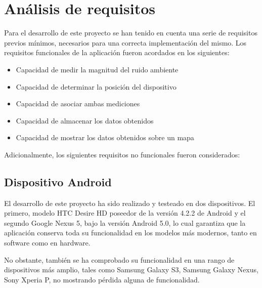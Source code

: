 \label{chp:Impl}

\section{Análisis de requisitos}
\label{sec:Requirements}

Para el desarrollo de este proyecto se han tenido en cuenta una serie de requisitos previos mínimos, necesarios para una correcta implementación del mismo. Los requisitos funcionales de la aplicación fueron acordados en los siguientes:

\begin{itemize}

\item Capacidad de medir la magnitud del ruido ambiente
\item Capacidad de determinar la posición del dispositivo
\item Capacidad de asociar ambas mediciones
\item Capacidad de almacenar los datos obtenidos
\item Capacidad de mostrar los datos obtenidos sobre un mapa

\end{itemize}


Adicionalmente, los siguientes requisitos no funcionales fueron considerados:

\subsection{Dispositivo Android}

El desarrollo de este proyecto ha sido realizado y testeado en dos dispositivos. El primero, modelo HTC Desire HD poseedor de la versión 4.2.2 de Android y el segundo Google Nexus 5, bajo la versión Android 5.0, lo cual garantiza que la aplicación conserva toda su funcionalidad en los modelos más modernos, tanto en software como en hardware. 

No obstante, también se ha comprobado su funcionalidad en una rango de dispositivos más amplio, tales como Samsung Galaxy S3, Samsung Galaxy Nexus, Sony Xperia P, no mostrando pérdida alguna de funcionalidad.

